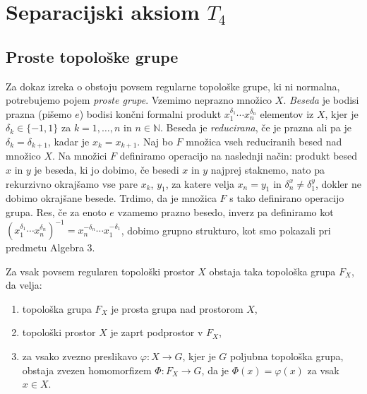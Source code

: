 \documentclass[mat1]{fmfdelo}
\newcommand{\N}{\mathbb N}
\begin{document}
\section{Separacijski aksiom $T_4$}

\subsection{Proste topološke grupe} 
Za dokaz izreka o obstoju povsem regularne topološke grupe, ki ni normalna, potrebujemo pojem \emph{proste grupe}. Vzemimo neprazno množico $X$. \emph{Beseda} je bodisi prazna (pišemo $e$) bodisi končni formalni produkt $x_1^{\delta_1}\cdots x_n^{\delta_n}$ elementov iz $X$, kjer je $\delta_k \in \lbrace -1, 1\rbrace$ za $k = 1,\dots,n$ in $n \in \N$. Beseda je \emph{reducirana}, če je prazna ali pa je $\delta_k = \delta_{k+1}$, kadar je $x_k = x_{k+1}$. Naj bo $F$ množica vseh reduciranih besed nad množico $X$. Na množici $F$ definiramo operacijo na naslednji način: produkt besed $x$ in $y$ je beseda, ki jo dobimo, če besedi $x$ in $y$ najprej staknemo, nato pa rekurzivno okrajšamo vse pare $x_k$, $y_1$, za katere velja $x_n = y_1$ in $\delta_n^x \neq \delta_1^y$, dokler ne dobimo okrajšane besede. Trdimo, da je množica $F$ s tako definirano operacijo grupa. Res, če za enoto $e$ vzamemo prazno besedo, inverz pa definiramo kot $(x_1^{\delta_1}\cdots x_n^{\delta_n})^{-1} = x_n^{-\delta_n}\cdots x_1^{-\delta_1}$, dobimo grupno strukturo, kot smo pokazali pri predmetu Algebra 3.

\begin{izrek}\label{izr:prostatopgrupa}
Za vsak povsem regularen topološki prostor $X$ obstaja taka topološka grupa $F_X$, da velja:
\begin{enumerate}
	\item topološka grupa $F_X$ je prosta grupa nad prostorom $X$,\label{podtrd:prosta1}
	\item topološki prostor $X$ je zaprt podprostor v $F_X$,\label{podtrd:prosta2}
	\item za vsako zvezno preslikavo $\varphi\colon X \to G$, kjer je $G$ poljubna topološka grupa, obstaja zvezen homomorfizem $\Phi\colon F_X \to G$, da je $\Phi(x) = \varphi(x)$ za vsak $x \in X$.\label{podtrd:prosta3}
\end{enumerate}
\end{izrek}
\end{document}
